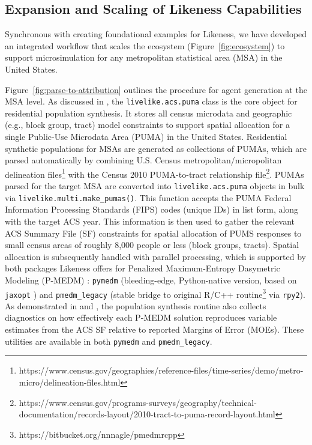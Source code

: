\subsection{Expansion and Scaling of Likeness Capabilities}\label{section:likeness-expansion-scaling}



Synchronous with creating foundational examples for Likeness, we have developed an integrated workflow that scales the ecosystem (Figure~\ref{fig:ecosystem}) to support microsimulation for any metropolitan statistical area (MSA) in the United States.

Figure~\ref{fig:parse-to-attribution} outlines the procedure for agent generation at the MSA level. As discussed in \cite{likeness-scipy-paper-2022}, the \texttt{livelike.acs.puma} class is the core object for residential population synthesis. It stores all census microdata and geographic (e.g., block group, tract) model constraints to support spatial allocation for a single Public-Use Microdata Area (PUMA) in the United States. Residential synthetic populations for MSAs are generated as collections of PUMAs, which are parsed automatically by combining U.S. Census metropolitan/micropolitan delineation files\footnote{https://www.census.gov/geographies/reference-files/time-series/demo/metro-micro/delineation-files.html} with the Census 2010 PUMA-to-tract relationship file\footnote{https://www.census.gov/programs-surveys/geography/technical-documentation/records-layout/2010-tract-to-puma-record-layout.html}. PUMAs parsed for the target MSA are converted into \texttt{livelike.acs.puma} objects in bulk via \texttt{livelike.multi.make\_pumas()}. This function accepts the PUMA Federal Information Processing Standards (FIPS) codes (unique IDs) in list form, along with the target ACS year. This information is then used to gather the relevant ACS Summary File (SF) constraints for spatial allocation of PUMS responses to small census areas of roughly 8,000 people or less (block groups, tracts). Spatial allocation is subsequently handled with parallel processing, which is supported by both packages Likeness offers for Penalized Maximum-Entropy Dasymetric Modeling (P-MEDM) \cite{nagle2014dasymetric}: \texttt{pymedm} (bleeding-edge, Python-native version, based on \texttt{jaxopt} \cite{jaxopt_implicit_diff}) and \texttt{pmedm\_legacy} (stable bridge to original R/C++ routine\footnote{https://bitbucket.org/nnnagle/pmedmrcpp} via \texttt{rpy2}). As demonstrated in \cite{likeness-scipy-paper-2022} and \cite{likeness-scipy-poster-2022}, the population synthesis routine also collects diagnostics on how effectively each P-MEDM solution reproduces variable estimates from the ACS SF relative to reported Margins of Error (MOEs). These utilities are available in both \texttt{pymedm} and \texttt{pmedm\_legacy}. 


